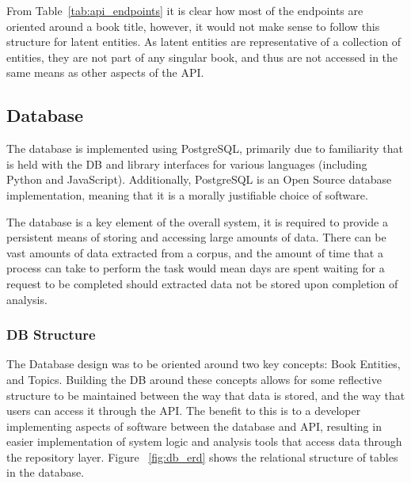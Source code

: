 \documentclass[10pt]{report}
\begin{document}
From Table~\ref{tab:api_endpoints} it is clear how most of the endpoints are oriented around a book title, however, it would not make sense to follow this structure for latent entities. As latent entities are representative of a collection of entities, they are not part of any singular book, and thus are not accessed in the same means as other aspects of the API.

\subsection{Database} The database is implemented using PostgreSQL, primarily due to familiarity that is held with the DB and library interfaces for various languages (including Python and JavaScript). Additionally, PostgreSQL is an Open Source database implementation, meaning that it is a morally justifiable choice of software.

The database is a key element of the overall system, it is required to provide a persistent means of storing and accessing large amounts of data. There can be vast amounts of data extracted from a corpus, and the amount of time that a process can take to perform the task would mean days are spent waiting for a request to be completed should extracted data not be stored upon completion of analysis.

\subsubsection{DB Structure}
The Database design was to be oriented around two key concepts: Book Entities, and Topics. Building the DB around these concepts allows for some reflective structure to be maintained between the way that data is stored, and the way that users can access it through the API. The benefit to this is to a developer implementing aspects of software between the database and API, resulting in easier implementation of system logic and analysis tools that access data through the repository layer. Figure ~\ref{fig:db_erd} shows the relational structure of tables in the database.
\end{document}
